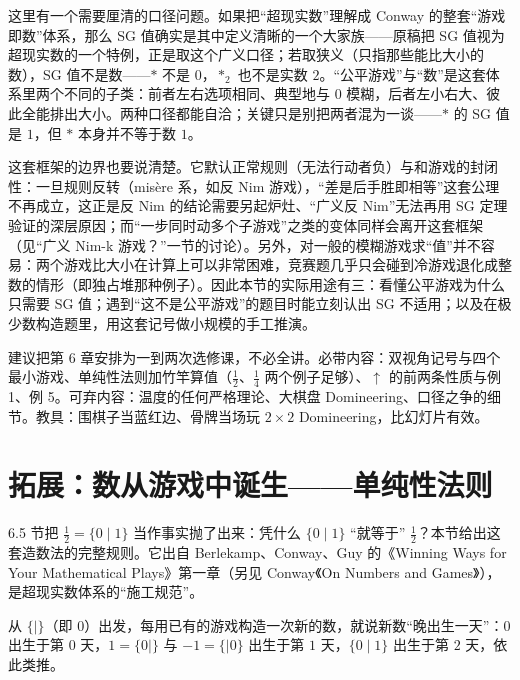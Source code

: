 \begin{pitfall}[口径与边界]
这里有一个需要厘清的口径问题。如果把“超现实数”理解成 Conway 的整套“游戏即数”体系，那么 SG 值确实是其中定义清晰的一个大家族——原稿把 SG 值视为超现实数的一个特例，正是取这个广义口径；若取狭义（只指那些能比大小的数），SG 值不是数——$\ast$ 不是 $0$，$\ast_2$ 也不是实数 $2$。“公平游戏”与“数”是这套体系里两个不同的子类：前者左右选项相同、典型地与 $0$ 模糊，后者左小右大、彼此全能排出大小。两种口径都能自洽；关键只是别把两者混为一谈——$\ast$ 的 SG 值是 $1$，但 $\ast$ 本身并不等于数 $1$。

这套框架的边界也要说清楚。它默认正常规则（无法行动者负）与和游戏的封闭性：一旦规则反转（misère 系，如反 Nim 游戏），“差是后手胜即相等”这套公理不再成立，这正是反 Nim 的结论需要另起炉灶、“广义反 Nim”无法再用 SG 定理验证的深层原因；而“一步同时动多个子游戏”之类的变体同样会离开这套框架（见“广义 Nim-k 游戏？”一节的讨论）。另外，对一般的模糊游戏求“值”并不容易：两个游戏比大小在计算上可以非常困难，竞赛题几乎只会碰到冷游戏退化成整数的情形（即独占堆那种例子）。因此本节的实际用途有三：看懂公平游戏为什么只需要 SG 值；遇到“这不是公平游戏”的题目时能立刻认出 SG 不适用；以及在极少数构造题里，用这套记号做小规模的手工推演。
\end{pitfall}

\begin{teach}[拓展板块的课堂取舍]
建议把第 6 章安排为一到两次选修课，不必全讲。必带内容：双视角记号与四个最小游戏、单纯性法则加竹竿算值（$\tfrac12$、$\tfrac14$ 两个例子足够）、$\uparrow$ 的前两条性质与例 1、例 5。可弃内容：温度的任何严格理论、大棋盘 Domineering、口径之争的细节。教具：围棋子当蓝红边、骨牌当场玩 $2\times2$ Domineering，比幻灯片有效。
\end{teach}
\section{拓展：数从游戏中诞生——单纯性法则}
6.5 节把 $\tfrac12=\{0\mid 1\}$ 当作事实抛了出来：凭什么 $\{0\mid 1\}$ “就等于” $\tfrac12$？本节给出这套造数法的完整规则。它出自 Berlekamp、Conway、Guy 的《Winning Ways for Your Mathematical Plays》第一章（另见 Conway《On Numbers and Games》），是超现实数体系的“施工规范”。

\begin{definition}[出生日]
从 $\{\mid\}$（即 $0$）出发，每用已有的游戏构造一次新的数，就说新数“晚出生一天”：$0$ 出生于第 $0$ 天，$1=\{0\mid\}$ 与 $-1=\{\mid 0\}$ 出生于第 $1$ 天，$\{0\mid 1\}$ 出生于第 $2$ 天，依此类推。
\end{definition}

